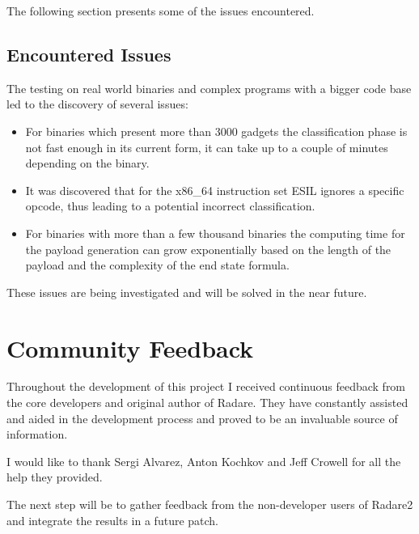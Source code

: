 The following section presents some of the issues encountered.

\subsection{Encountered Issues}
\label{sec:issues}

The testing on real world binaries and complex programs with a bigger code base led to the discovery of several issues:

\begin{itemize}
	\item For binaries which present more than 3000 gadgets the classification phase is not fast enough in its current form, it can take up to a couple of minutes depending on the binary.
	\item It was discovered that for the x86_64 instruction set ESIL ignores a specific opcode, thus leading to a potential incorrect classification.
	\item For binaries with more than a few thousand binaries the computing time for the payload generation can grow exponentially based on the length of the payload and the complexity of the end state formula.
\end{itemize}

These issues are being investigated and will be solved in the near future.

\section{Community Feedback}

Throughout the development of this project I received continuous feedback from the core developers and original author of Radare. They have constantly assisted and aided in the development process and proved to be an invaluable source of information.

I would like to thank Sergi Alvarez, Anton Kochkov and Jeff Crowell for all the help they provided.

The next step will be to gather feedback from the non-developer users of Radare2 and integrate the results in a future patch.

